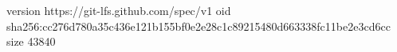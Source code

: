 version https://git-lfs.github.com/spec/v1
oid sha256:cc276d780a35c436e121b155bf0e2e28c1c89215480d663338fc11be2e3cd6cc
size 43840
